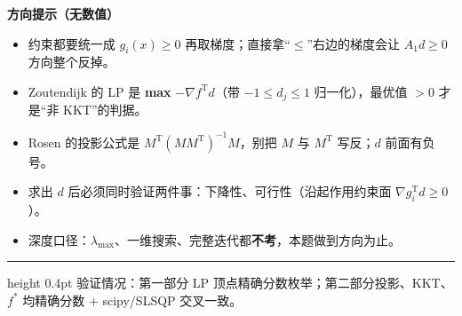 \documentclass[11pt]{ctexart}
\begin{document}
\vspace{8pt}
\textbf{方向提示（无数值）}
\begin{itemize}\setlength{\itemsep}{2pt}
\item 约束都要统一成 $g_i(x)\geq 0$ 再取梯度；直接拿``$\leq$''右边的梯度会让 $A_1d\geq 0$ 方向整个反掉。
\item Zoutendijk 的 LP 是 \textbf{max} $-\nabla f^{\mathrm T}d$（带 $-1\leq d_j\leq 1$ 归一化），最优值 $>0$ 才是``非 KKT''的判据。
\item Rosen 的投影公式是 $M^{\mathrm T}(MM^{\mathrm T})^{-1}M$，别把 $M$ 与 $M^{\mathrm T}$ 写反；$d$ 前面有负号。
\item 求出 $d$ 后必须同时验证两件事：下降性、可行性（沿起作用约束面 $\nabla g_i^{\mathrm T}d\geq 0$）。
\item 深度口径：$\lambda_{\max}$、一维搜索、完整迭代都\textbf{不考}，本题做到方向为止。
\end{itemize}

\vspace{10pt}
\hrule height 0.4pt
\vspace{4pt}
{\small\color{mygray}验证情况：第一部分 LP 顶点精确分数枚举；第二部分投影、KKT、$f^{*}$ 均精确分数 + scipy/SLSQP 交叉一致。}
\end{document}
